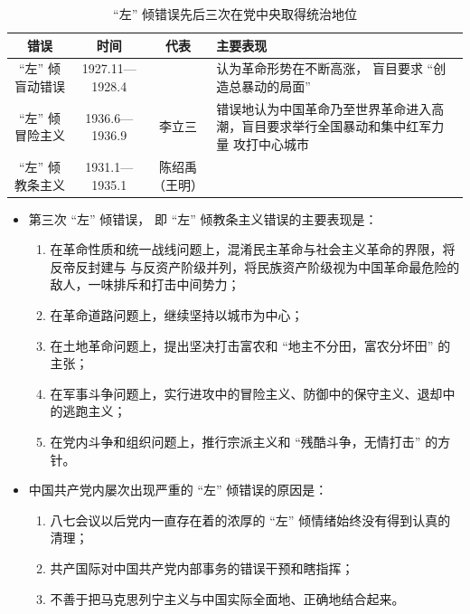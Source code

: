 \documentclass[10pt, UTF8]{book} %
\begin{document}
\begin{table}[H]
    \centering
    \caption{“左” 倾错误先后三次在党中央取得统治地位}
    \begin{tabular}{c c c p{}}
        \hline 
        错误 & 时间 & 代表 & 主要表现 \\
        \hline 
        “左” 倾盲动错误 & 1927.11—1928.4 & & 认为革命形势在不断高涨，
        盲目要求 “创造总暴动的局面” \\ 
        “左” 倾冒险主义 & 1936.6—1936.9 & 李立三 & 
        错误地认为中国革命乃至世界革命进入高潮，盲目要求举行全国暴动和集中红军力量
        攻打中心城市 \\ 
        “左” 倾教条主义 & 1931.1—1935.1 & 陈绍禹（王明） &  \\ 
        \hline
    \end{tabular}
\end{table}

\begin{itemize}[itemsep=0pt]
    \item 第三次 “左” 倾错误， 即 “左” 倾教条主义错误的主要表现是：
    \begin{enumerate}[itemsep=0pt, label={(\arabic*)}]
        \item 在革命性质和统一战线问题上，混淆民主革命与社会主义革命的界限，将反帝反封建与
        与反资产阶级并列，将民族资产阶级视为中国革命最危险的敌人，一味排斥和打击中间势力；
        \item 在革命道路问题上，继续坚持以城市为中心；
        \item 在土地革命问题上，提出坚决打击富农和 “地主不分田，富农分坏田” 的主张；
        \item 在军事斗争问题上，实行进攻中的冒险主义、防御中的保守主义、退却中的逃跑主义；
        \item 在党内斗争和组织问题上，推行宗派主义和 “残酷斗争，无情打击” 的方针。
    \end{enumerate}
    \item 中国共产党内屡次出现严重的 “左” 倾错误的原因是：
    \begin{enumerate}[itemsep=0pt, label={(\arabic*)}]
        \item 八七会议以后党内一直存在着的浓厚的 “左” 倾情绪始终没有得到认真的清理；
        \item 共产国际对中国共产党内部事务的错误干预和瞎指挥；
        \item 不善于把马克思列宁主义与中国实际全面地、正确地结合起来。
    \end{enumerate}
\end{itemize}
\end{document}

